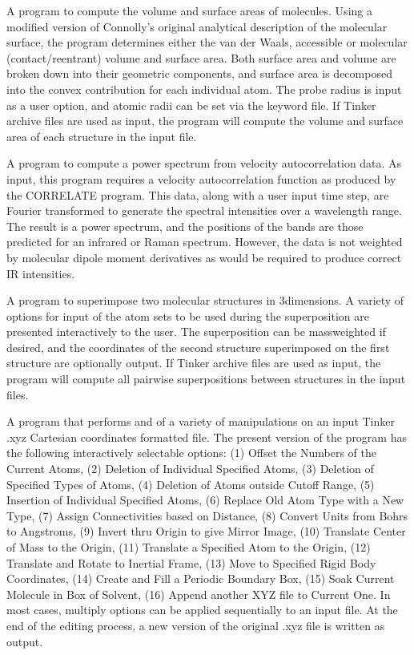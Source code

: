 \documentclass[letterpaper,11pt,english]{sphinxmanual}
\begin{document}

A program to compute the volume and surface areas of molecules. Using a modified version of Connolly’s original analytical description of the molecular surface, the program determines either the van der Waals, accessible or molecular (contact/reentrant) volume and surface area. Both surface area and volume are broken down into their geometric components, and surface area is decomposed into the convex contribution for each individual atom. The probe radius is input as a user option, and atomic radii can be set via the keyword file. If Tinker archive files are used as input, the program will compute the volume and surface area of each structure in the input file.


A program to compute a power spectrum from velocity autocorrelation data. As input, this program requires a velocity autocorrelation function as produced by the CORRELATE program. This data, along with a user input time step, are Fourier transformed to generate the spectral intensities over a wavelength range. The result is a power spectrum, and the positions of the bands are those predicted for an infrared or Raman spectrum. However, the data is not weighted by molecular dipole moment derivatives as would be required to produce correct IR intensities.


A program to superimpose two molecular structures in 3\sphinxhyphen{}dimensions. A variety of options for input of the atom sets to be used during the superposition are presented interactively to the user. The superposition can be mass\sphinxhyphen{}weighted if desired, and the coordinates of the second structure superimposed on the first structure are optionally output. If Tinker archive files are used as input, the program will compute all pairwise superpositions between structures in the input files.


A program that performs and of a variety of manipulations on an input Tinker .xyz Cartesian coordinates formatted file. The present version of the program has the following interactively selectable options: (1) Offset the Numbers of the Current Atoms, (2) Deletion of Individual Specified Atoms, (3) Deletion of Specified Types of Atoms, (4) Deletion of Atoms outside Cutoff Range, (5) Insertion of Individual Specified Atoms, (6) Replace Old Atom Type with a New Type, (7) Assign Connectivities based on Distance, (8) Convert Units from Bohrs to Angstroms, (9) Invert thru Origin to give Mirror Image, (10) Translate Center of Mass to the Origin, (11) Translate a Specified Atom to the Origin, (12) Translate and Rotate to Inertial Frame, (13) Move to Specified Rigid Body Coordinates, (14) Create and Fill a Periodic Boundary Box, (15) Soak Current Molecule in Box of Solvent, (16) Append another XYZ file to Current One. In most cases, multiply options can be applied sequentially to an input file. At the end of the editing process, a new version of the original .xyz file is written as output.
\end{document}
